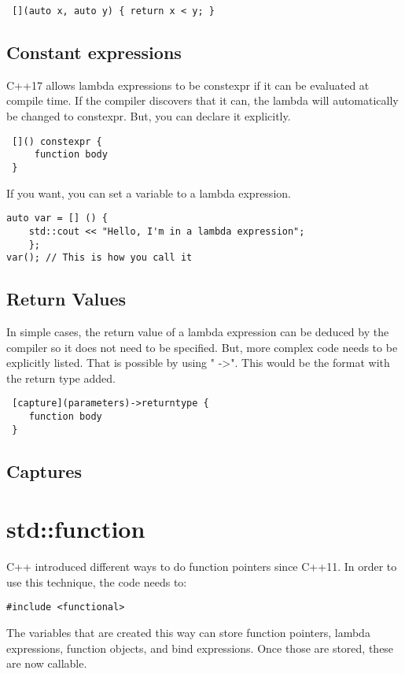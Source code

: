 \begin{lstlisting}
 [](auto x, auto y) { return x < y; }    
\end{lstlisting}

\subsection{Constant expressions}
C++17 allows lambda expressions to be constexpr if it can be evaluated at compile time. If the compiler discovers that it can, the lambda will automatically be changed to constexpr. But, you can declare it explicitly.

\begin{verbatim}
 []() constexpr {
     function body
 }    
\end{verbatim}

If you want, you can set a variable to a lambda expression. 

\begin{lstlisting}
auto var = [] () { 
    std::cout << "Hello, I'm in a lambda expression"; 
    };
var(); // This is how you call it
\end{lstlisting}

\subsection{Return Values}
In simple cases, the return value of a lambda expression can be deduced by the compiler so it does not need to be specified. But, more complex code needs to be explicitly listed. That is possible by using " -\textgreater ". This would be the format with the return type added.

\begin{verbatim}
 [capture](parameters)->returntype {
    function body
 }    
\end{verbatim}

\subsection{Captures}

\section{std::function}
\label{stdfunction}
C++ introduced different ways to do function pointers since C++11. In order to use this
technique, the code needs to: 
\begin{lstlisting}
#include <functional>
\end{lstlisting}
The variables that are created this way can store function pointers, lambda expressions, 
function objects, and bind expressions. Once those are stored, these are now callable.

